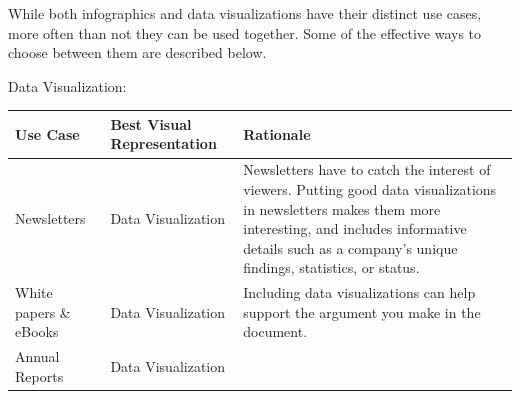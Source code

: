 \documentclass[]{book}
\begin{document}
While both infographics and data visualizations have their distinct use cases, more often than not they can be used together. Some of the effective ways to choose between them are described below.

Data Visualization:

\begin{longtable}[]{@{}lll@{}}
\toprule
\begin{minipage}[b]{0.13\columnwidth}\raggedright
Use Case\strut
\end{minipage} & \begin{minipage}[b]{0.18\columnwidth}\raggedright
Best Visual Representation\strut
\end{minipage} & \begin{minipage}[b]{0.60\columnwidth}\raggedright
Rationale\strut
\end{minipage}\tabularnewline
\midrule
\endhead
\begin{minipage}[t]{0.13\columnwidth}\raggedright
Newsletters\strut
\end{minipage} & \begin{minipage}[t]{0.18\columnwidth}\raggedright
Data Visualization\strut
\end{minipage} & \begin{minipage}[t]{0.60\columnwidth}\raggedright
Newsletters have to catch the interest of viewers. Putting good data visualizations in newsletters makes them more interesting, and includes informative details such as a company's unique findings, statistics, or status.\strut
\end{minipage}\tabularnewline
\begin{minipage}[t]{0.13\columnwidth}\raggedright
White papers \& eBooks\strut
\end{minipage} & \begin{minipage}[t]{0.18\columnwidth}\raggedright
Data Visualization\strut
\end{minipage} & \begin{minipage}[t]{0.60\columnwidth}\raggedright
Including data visualizations can help support the argument you make in the document.\strut
\end{minipage}\tabularnewline
\begin{minipage}[t]{0.13\columnwidth}\raggedright
Annual Reports\strut
\end{minipage} & \begin{minipage}[t]{0.18\columnwidth}\raggedright
Data Visualization\strut
\end{minipage} & \begin{minipage}[t]{0.60\columnwidth}\raggedright

\end{minipage}
\end{longtable}
\end{document}
